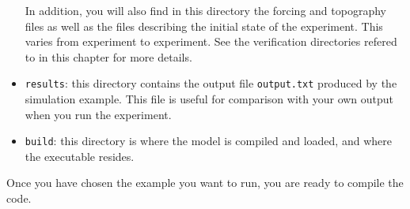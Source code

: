 \begin{itemize}
  In addition, you will also find in this directory the forcing and
  topography files as well as the files describing the initial state
  of the experiment.  This varies from experiment to experiment. See
  the verification directories refered to in this chapter for more details.

\item \texttt{results}: this directory contains the output file
  \texttt{output.txt} produced by the simulation example. This file is
  useful for comparison with your own output when you run the
  experiment.

\item \texttt{build}: this directory is where the model is compiled
  and loaded, and where the executable resides.

\end{itemize}

Once you have chosen the example you want to run, you are ready to
compile the code.

